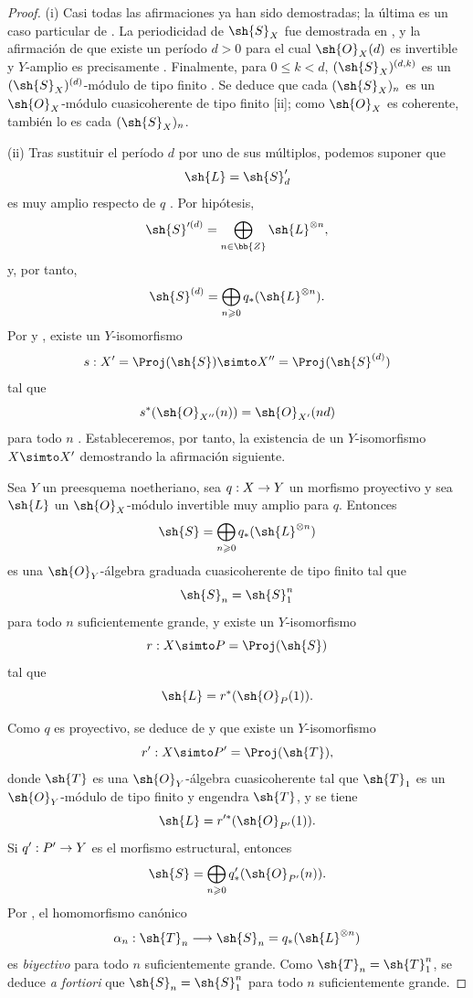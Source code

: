 \documentclass[oneside]{amsart}
\makeatletter
\renewcommand{\leq}{\leqslant}
\renewcommand{\geq}{\geqslant}
\newcommand{\ega@arrow}[2]{\mathchoice{#1}{#2}{#2}{#2}}
\renewcommand{\to}{\ega@arrow{\longrightarrow}{\rightarrow}}
\newcommand{\oldpage}[2][]{{\marginnote{\normalfont\textbf{#1}~|~#2}}\ignorespaces}
\let\EGAOriginalLabel\label
\renewcommand{\label}[1]{\phantomsection\EGAOriginalLabel{#1}}
\makeatother
\begin{document}
\begin{proof}
(i) Casi todas las afirmaciones ya han sido demostradas; la última es un caso particular de .
La periodicidad de $\sh{S}_X$ fue demostrada en , y la afirmación de que existe un período $d>0$ para el cual $\sh{O}_X(d)$ es invertible y $Y$-amplio es precisamente .
Finalmente, para $0\leq k<d$, $(\sh{S}_X)^{(d,k)}$ es un $(\sh{S}_X)^{(d)}$-módulo de tipo finito .
Se deduce que cada $(\sh{S}_X)_n$ es un $\sh{O}_X$-módulo cuasicoherente de tipo finito [ii]; como $\sh{O}_X$ es coherente, también lo es cada $(\sh{S}_X)_n$.

(ii) Tras sustituir el período $d$ por uno de sus múltiplos, podemos suponer que
\[
  \sh{L}=\sh{S}'_d
\]
es muy amplio respecto de $q$ .
Por hipótesis,
\[
  \sh{S}'^{(d)}
  =\bigoplus_{n\in\bb{Z}}\sh{L}^{\otimes n},
\]
y, por tanto,
\[
  \sh{S}^{(d)}
  =\bigoplus_{n\geq0}q_*(\sh{L}^{\otimes n}).
\]
Por  y , existe un $Y$-isomorfismo
\[
  s:X'=\Proj(\sh{S})\simto
  X''=\Proj(\sh{S}^{(d)})
\]
tal que
\oldpage[III]{105}
\[
  s^*(\sh{O}_{X''}(n))=\sh{O}_{X'}(nd)
\]
para todo $n$ .
Estableceremos, por tanto, la existencia de un $Y$-isomorfismo $X\simto X'$ demostrando la afirmación siguiente.

\begin{proposition}[2.3.4.1]
\label{III.2.3.4.1}
Sea $Y$ un preesquema noetheriano, sea $q:X\to Y$ un morfismo proyectivo y sea $\sh{L}$ un $\sh{O}_X$-módulo invertible muy amplio para $q$.
Entonces
\[
  \sh{S}=\bigoplus_{n\geq0}q_*(\sh{L}^{\otimes n})
\]
es una $\sh{O}_Y$-álgebra graduada cuasicoherente de tipo finito tal que
\[
  \sh{S}_n=\sh{S}_1^n
\]
para todo $n$ suficientemente grande, y existe un $Y$-isomorfismo
\[
  r:X\simto P=\Proj(\sh{S})
\]
tal que
\[
  \sh{L}=r^*(\sh{O}_P(1)).
\]
\end{proposition}

Como $q$ es proyectivo, se deduce de  y  que existe un $Y$-isomorfismo
\[
  r':X\simto P'=\Proj(\sh{T}),
\]
donde $\sh{T}$ es una $\sh{O}_Y$-álgebra cuasicoherente tal que $\sh{T}_1$ es un $\sh{O}_Y$-módulo de tipo finito y engendra $\sh{T}$, y se tiene
\[
  \sh{L}=r'^*(\sh{O}_{P'}(1)).
\]
Si $q':P'\to Y$ es el morfismo estructural, entonces
\[
  \sh{S}=\bigoplus_{n\geq0}q'_*(\sh{O}_{P'}(n)).
\]
Por , el homomorfismo canónico
\[
  \alpha_n:\sh{T}_n\longrightarrow
  \sh{S}_n=q_*(\sh{L}^{\otimes n})
\]
es \emph{biyectivo} para todo $n$ suficientemente grande.
Como $\sh{T}_n=\sh{T}_1^n$, se deduce \emph{a fortiori} que $\sh{S}_n=\sh{S}_1^n$ para todo $n$ suficientemente grande.


\end{proof}
\end{document}
